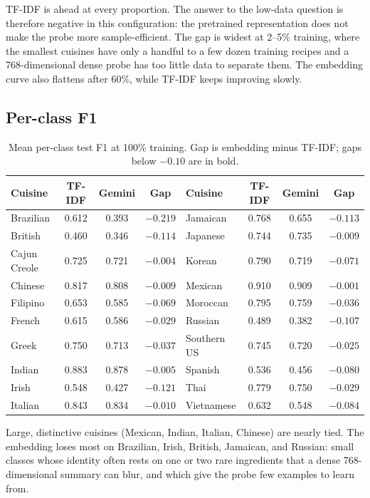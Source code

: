 \documentclass[11pt,letterpaper]{article}
\newcommand{\tfidf}{TF-IDF}
\begin{document}
\tfidf{} is ahead at every proportion. The answer to the low-data question is therefore negative in this configuration: the pretrained representation does not make the probe more sample-efficient. The gap is widest at 2--5\% training, where the smallest cuisines have only a handful to a few dozen training recipes and a 768-dimensional dense probe has too little data to separate them. The embedding curve also flattens after 60\%, while \tfidf{} keeps improving slowly.

\subsection{Per-class F1}

\begin{table}[H]
\centering
\caption{Mean per-class test F1 at 100\% training. Gap is embedding minus \tfidf{}; gaps below $-0.10$ are in bold.}
\label{tab:perclass}
\small
\begin{tabular}{@{}lccc@{\qquad}lccc@{}}
\toprule
Cuisine & \tfidf{} & Gemini & Gap & Cuisine & \tfidf{} & Gemini & Gap \\
\midrule
Brazilian & 0.612 & 0.393 & $\mathbf{-0.219}$ & Jamaican & 0.768 & 0.655 & $\mathbf{-0.113}$ \\
British & 0.460 & 0.346 & $\mathbf{-0.114}$ & Japanese & 0.744 & 0.735 & $-0.009$ \\
Cajun Creole & 0.725 & 0.721 & $-0.004$ & Korean & 0.790 & 0.719 & $-0.071$ \\
Chinese & 0.817 & 0.808 & $-0.009$ & Mexican & 0.910 & 0.909 & $-0.001$ \\
Filipino & 0.653 & 0.585 & $-0.069$ & Moroccan & 0.795 & 0.759 & $-0.036$ \\
French & 0.615 & 0.586 & $-0.029$ & Russian & 0.489 & 0.382 & $\mathbf{-0.107}$ \\
Greek & 0.750 & 0.713 & $-0.037$ & Southern US & 0.745 & 0.720 & $-0.025$ \\
Indian & 0.883 & 0.878 & $-0.005$ & Spanish & 0.536 & 0.456 & $-0.080$ \\
Irish & 0.548 & 0.427 & $\mathbf{-0.121}$ & Thai & 0.779 & 0.750 & $-0.029$ \\
Italian & 0.843 & 0.834 & $-0.010$ & Vietnamese & 0.632 & 0.548 & $-0.084$ \\
\bottomrule
\end{tabular}
\end{table}

Large, distinctive cuisines (Mexican, Indian, Italian, Chinese) are nearly tied. The embedding loses most on Brazilian, Irish, British, Jamaican, and Russian: small classes whose identity often rests on one or two rare ingredients that a dense 768-dimensional summary can blur, and which give the probe few examples to learn from.
\end{document}
